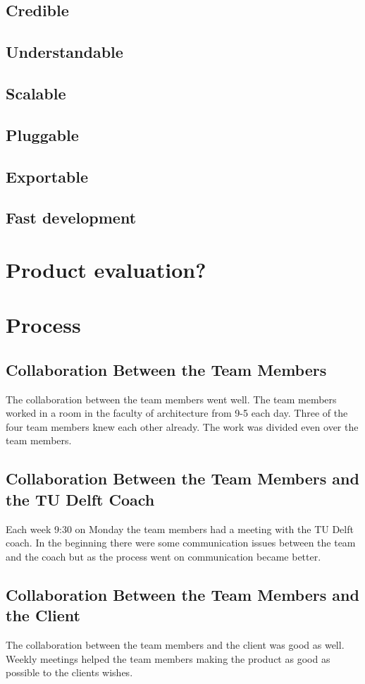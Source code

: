 \subsection{Credible}

\subsection{Understandable}

\subsection{Scalable}

\subsection{Pluggable}

\subsection{Exportable}

\subsection{Fast development}

\section{Product evaluation?}



\section{Process}

\subsection{Collaboration Between the Team Members}
The collaboration between the team members went well. The team members worked in a room in the faculty of architecture from 9-5 each day. Three of the four team members knew each other already. The work was divided even over the team members. 

\subsection{Collaboration Between the Team Members and the TU Delft Coach}
Each week 9:30 on Monday the team members had a meeting with the TU Delft coach. In the beginning there were some communication issues between the team and the coach but as the process went on communication became better.

\subsection{Collaboration Between the Team Members and the Client}
The collaboration between the team members and the client was good as well. 
Weekly meetings helped the team members making the product as good as possible to the clients wishes. 